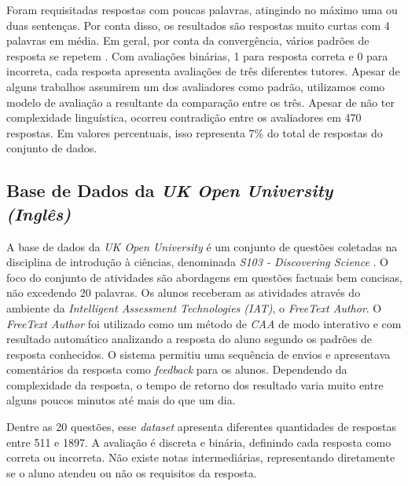 Foram requisitadas respostas com poucas palavras, atingindo no máximo uma ou duas sentenças. Por conta disso, os resultados são respostas muito curtas com 4 palavras em média. Em geral, por conta da convergência, vários padrões de resposta se repetem \cite{riordan2017}. Com avaliações binárias, 1 para resposta correta e 0 para incorreta, cada resposta apresenta avaliações de três diferentes tutores. Apesar de alguns trabalhos assumirem um dos avaliadores como padrão, utilizamos como modelo de avaliação a resultante da comparação entre os três. Apesar de não ter complexidade linguística, ocorreu contradição entre os avaliadores em 470 respostas. Em valores percentuais, isso representa 7\% do total de respostas do conjunto de dados.

\subsection{Base de Dados da \textit{UK Open University} \textit{(Inglês)}}
\label{openunv-db}

A base de dados da \textit{UK Open University} é um conjunto de questões coletadas na disciplina de introdução à ciências, denominada \textit{S103 - Discovering Science} \cite{jordan2012}. O foco do conjunto de atividades são abordagens em questões factuais bem concisas, não excedendo 20 palavras. Os alunos receberam as atividades através do ambiente da \textit{Intelligent Assessment Technologies (IAT)}, o \textit{FreeText Author}. O \textit{FreeText Author} foi utilizado como um método de \textit{CAA} de modo interativo e com resultado automático analizando a resposta do aluno segundo os padrões de resposta conhecidos. O sistema permitiu uma sequência de envios e apresentava comentários da resposta como \textit{feedback} para os alunos. Dependendo da complexidade da resposta, o tempo de retorno dos resultado varia muito entre alguns poucos minutos até mais do que um dia.

Dentre as 20 questões, esse \textit{dataset} apresenta diferentes quantidades de respostas entre 511 e 1897. A avaliação é discreta e binária, definindo cada resposta como correta ou incorreta. Não existe notas intermediárias, representando diretamente se o aluno atendeu ou não os requisitos da resposta.


